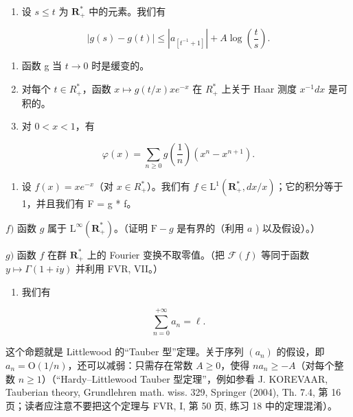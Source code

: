 \begin{enumerate}
\def\labelenumi{\alph{enumi})}
\tightlist
\item
  设 \(s \leqslant t\) 为 \(\mathbf{R}_{+}^{*}\) 中的元素。我们有
\end{enumerate}

\[
| g (s) - g (t) | \leqslant | a _ {[ t ^ {- 1} + 1 ]} | + A \log \left(\frac {t}{s}\right).
\]

\begin{enumerate}
\def\labelenumi{\alph{enumi})}
\setcounter{enumi}{1}
\item
  函数 g 当 \(t \rightarrow 0\) 时是缓变的。
\item
  对每个 \(t \in R_{+}^{*}\)，函数 \(x \mapsto g(t/x)xe^{-x}\) 在 \(R_{+}^{*}\) 上关于 Haar 测度 \(x^{-1}dx\) 是可积的。
\item
  对 \(0 < x < 1\)，有
\end{enumerate}

\[
\varphi (x) = \sum_ {n \geqslant 0} g \left(\frac {1}{n}\right) \left(x ^ {n} - x ^ {n + 1}\right).
\]

\begin{enumerate}
\def\labelenumi{\alph{enumi})}
\setcounter{enumi}{4}
\tightlist
\item
  设 \(f(x) = xe^{-x}\)（对 \(x \in R_{+}^{*}\)）。我们有 \(f \in \mathrm{L}^{1}(\mathbf{R}_{+}^{*}, dx/x)\)；它的积分等于 1，并且我们有 F = g * f。
\end{enumerate}

\(f)\) 函数 \(g\) 属于 \(\mathrm{L}^{\infty}(\mathbf{R}_{+}^{*})\)。（证明 \(\mathrm{F}-g\) 是有界的（利用 \(a\) ) 以及假设）。）

\(g)\) 函数 \(f\) 在群 \(\mathbf{R}_{+}^{*}\) 上的 Fourier 变换不取零值。（把 \(\mathcal{F}(f)\) 等同于函数 \(y\mapsto\Gamma(1+iy)\) 并利用 FVR, VII。）

\begin{enumerate}
\def\labelenumi{\alph{enumi})}
\setcounter{enumi}{7}
\tightlist
\item
  我们有
\end{enumerate}

\[
\sum_ {n = 0} ^ {+ \infty} a _ {n} = \ell .
\]

这个命题就是 Littlewood 的“Tauber 型”定理。关于序列 \((a_n)\) 的假设，即 \(a_n = \mathrm{O}(1/n)\)，还可以减弱：只需存在常数 \(A \geqslant 0\)，使得 \(na_n \geqslant -A\)（对每个整数 \(n \geqslant 1\)）（“Hardy–Littlewood Tauber 型定理”，例如参看 J. KOREVAAR, Tauberian theory, Grundlehren math. wiss. 329, Springer (2004), Th. 7.4, 第 16 页；读者应注意不要把这个定理与 FVR, I, 第 50 页, 练习 18 中的定理混淆）。

